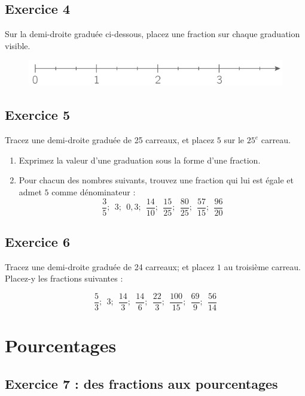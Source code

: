 \documentclass[14 pt]{extarticle}
\theoremstyle{plain}
\begin{document}
 \subsection*{Exercice 4}
 
Sur la demi-droite graduée ci-dessous, placez une fraction sur chaque graduation visible.

\begin{figure}[H]
\includegraphics[width=15cm]{Axe.png}
\end{figure} 


\subsection*{Exercice 5}

Tracez une demi-droite graduée de 25 carreaux, et placez $5$ sur le $25^e$ carreau.
\begin{enumerate}
\item Exprimez la valeur d'une graduation sous la forme d'une fraction.
\item Pour chacun des nombres suivants, trouvez une fraction qui lui est égale et admet $5$ comme dénominateur : 
\[ \frac35; \ \ 
3; \ \ 
0,3; \ \ 
\frac{14}{10}; \ \ 
\frac{15}{25}; \ \ 
\frac{80}{25}; \ \ 
\frac{57}{15}; \ \ 
\frac{96}{20}\]

\end{enumerate}
 
 \subsection*{Exercice 6}
 
 Tracez une demi-droite graduée de 24 carreaux; et placez $1$ au troisième carreau. Placez-y les fractions suivantes : 
 
\[ \frac53; \ \ 
3; \ \ 
\frac{14}3; \ \ 
\frac{14}6; \ \ 
\frac{22}3; \ \ 
\frac{100}{15}; \ \ 
\frac{69}{9}; \ \ 
\frac{56}{14}\]
\section{Pourcentages}
\subsection*{Exercice 7 : des fractions aux pourcentages}
\end{document}
